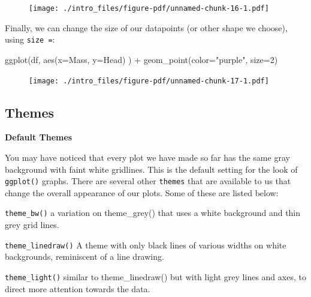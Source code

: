 \documentclass[
  letterpaper,
  DIV=11,
  numbers=noendperiod]{scrreprt}
\newenvironment{Shaded}{\begin{snugshade}}{\end{snugshade}}
\newcommand{\AttributeTok}[1]{\textcolor[rgb]{0.40,0.45,0.13}{#1}}
\newcommand{\DecValTok}[1]{\textcolor[rgb]{0.68,0.00,0.00}{#1}}
\newcommand{\FunctionTok}[1]{\textcolor[rgb]{0.28,0.35,0.67}{#1}}
\newcommand{\NormalTok}[1]{\textcolor[rgb]{0.00,0.23,0.31}{#1}}
\newcommand{\SpecialCharTok}[1]{\textcolor[rgb]{0.37,0.37,0.37}{#1}}
\newcommand{\StringTok}[1]{\textcolor[rgb]{0.13,0.47,0.30}{#1}}
\begin{document}
\begin{figure}[H]

{\centering \texttt{[image: ./intro\_files/figure-pdf/unnamed-chunk-16-1.pdf]}

}

\end{figure}

Finally, we can change the size of our datapoints (or other shape we
choose), using \texttt{size\ =}:

\begin{Shaded}
\begin{Highlighting}[]
\FunctionTok{ggplot}\NormalTok{(df, }\FunctionTok{aes}\NormalTok{(}\AttributeTok{x=}\NormalTok{Mass, }\AttributeTok{y=}\NormalTok{Head) ) }\SpecialCharTok{+} \FunctionTok{geom\_point}\NormalTok{(}\AttributeTok{color=}\StringTok{"purple"}\NormalTok{, }\AttributeTok{size=}\DecValTok{2}\NormalTok{)}
\end{Highlighting}
\end{Shaded}

\begin{figure}[H]

{\centering \texttt{[image: ./intro\_files/figure-pdf/unnamed-chunk-17-1.pdf]}

}

\end{figure}

\hypertarget{themes}{%
\subsection{Themes}\label{themes}}

\textbf{Default Themes}

You may have noticed that every plot we have made so far has the same
gray background with faint white gridlines. This is the default setting
for the look of \texttt{ggplot()} graphs. There are several other
\texttt{themes} that are available to us that change the overall
appearance of our plots. Some of these are listed below:

\texttt{theme\_bw()} a variation on theme\_grey() that uses a white
background and thin grey grid lines.

\texttt{theme\_linedraw()} A theme with only black lines of various
widths on white backgrounds, reminiscent of a line drawing.

\texttt{theme\_light()} similar to theme\_linedraw() but with light grey
lines and axes, to direct more attention towards the data.
\end{document}
